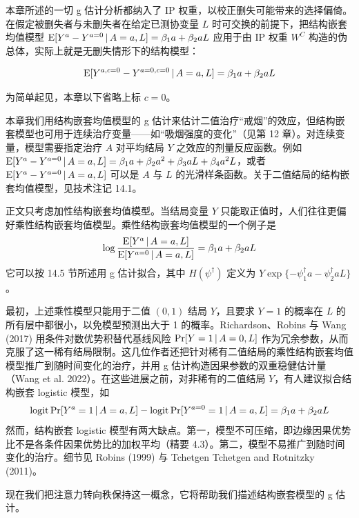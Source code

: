 本章所述的一切 g 估计分析都纳入了 IP 权重，以校正删失可能带来的选择偏倚。在假定被删失者与未删失者在给定已测协变量 $L$ 时可交换的前提下，把结构嵌套均值模型 $\mathrm{E}[Y^a-Y^{a=0}\,|\, A=a,L]=\beta_1a+\beta_2aL$ 应用于由 IP 权重 $W^C$ 构造的伪总体，实际上就是无删失情形下的结构模型：

\[
\mathrm{E}[Y^{a,c=0}-Y^{a=0,c=0}\,|\, A=a,L]=\beta_1a+\beta_2aL
\]


为简单起见，本章以下省略上标 $c=0$。

本章我们用结构嵌套均值模型的 g 估计来估计二值治疗“戒烟”的效应，但结构嵌套模型也可用于连续治疗变量——如“吸烟强度的变化”（见第 12 章）。对连续变量，模型需要指定治疗 $A$ 对平均结局 $Y$ 之效应的剂量反应函数。例如 $\mathrm{E}[Y^a-Y^{a=0}\,|\, A=a,L]=\beta_1a+\beta_2a^2+\beta_3aL+\beta_4a^2L$，或者 $\mathrm{E}[Y^a-Y^{a=0}\,|\, A=a,L]$ 可以是 $A$ 与 $L$ 的光滑样条函数。关于二值结局的结构嵌套均值模型，见技术注记 14.1。

\begin{techpoint}[乘性结构嵌套均值模型]
正文只考虑加性结构嵌套均值模型。当结局变量 $Y$ 只能取正值时，人们往往更偏好乘性结构嵌套均值模型。乘性结构嵌套均值模型的一个例子是
\[
\log\frac{\mathrm{E}[Y^a\,|\, A=a,L]}{\mathrm{E}[Y^{a=0}\,|\, A=a,L]}=\beta_1a+\beta_2aL
\]
它可以按 14.5 节所述用 g 估计拟合，其中 $H(\psi^\dagger)$ 定义为 $Y\exp\{-\psi_1^\dagger a-\psi_2^\dagger aL\}$。

最初，上述乘性模型只能用于二值 $(0,1)$ 结局 $Y$，且要求 $Y=1$ 的概率在 $L$ 的所有层中都很小，以免模型预测出大于 1 的概率。Richardson、Robins 与 Wang (2017) 用条件对数优势积替代基线风险 $\Pr[Y=1\,|\, A=0,L]$ 作为冗余参数，从而克服了这一稀有结局限制。这几位作者还把针对稀有二值结局的乘性结构嵌套均值模型推广到随时间变化的治疗，并用 g 估计构造因果参数的双重稳健估计量（Wang et al. 2022）。在这些进展之前，对非稀有的二值结局 $Y$，有人建议拟合结构嵌套 logistic 模型，如
\[
\operatorname{logit}\Pr[Y^a=1\,|\, A=a,L]-\operatorname{logit}\Pr[Y^{a=0}=1\,|\, A=a,L]=\beta_1a+\beta_2aL
\]
然而，结构嵌套 logistic 模型有两大缺点。第一，模型不可压缩，即边缘因果优势比不是各条件因果优势比的加权平均（精要 4.3）。第二，模型不易推广到随时间变化的治疗。细节见 Robins (1999) 与 Tchetgen Tchetgen and Rotnitzky (2011)。
\end{techpoint}

现在我们把注意力转向秩保持这一概念，它将帮助我们描述结构嵌套模型的 g 估计。

